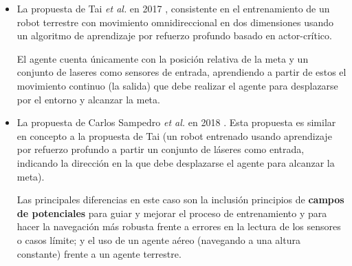 \begin{itemize}
	\item La propuesta de Tai \textit{et al.} en 2017 \cite{Tai2017VirtualtorealDR}, consistente en el entrenamiento de un robot terrestre con movimiento omnidireccional en dos dimensiones usando un algoritmo de aprendizaje por refuerzo profundo basado en actor-crítico.
	
	El agente cuenta únicamente con la posición relativa de la meta y un conjunto de laseres como sensores de entrada, aprendiendo a partir de estos el movimiento continuo (la salida) que debe realizar el agente para desplazarse por el entorno y alcanzar la meta.
	\item La propuesta de Carlos Sampedro \textit{et al.} en 2018 \cite{Sampedro2018}. Esta propuesta es similar en concepto a la propuesta de Tai (un robot entrenado usando aprendizaje por refuerzo profundo a partir un conjunto de láseres como entrada, indicando la dirección en la que debe desplazarse el agente para alcanzar la meta).
	
	Las principales diferencias en este caso son la inclusión principios de \textbf{campos de potenciales} para guiar y mejorar el proceso de entrenamiento y para hacer la navegación más robusta frente a errores en la lectura de los sensores o casos límite; y el uso de un agente aéreo (navegando a una altura constante) frente a un agente terrestre.
\end{itemize}